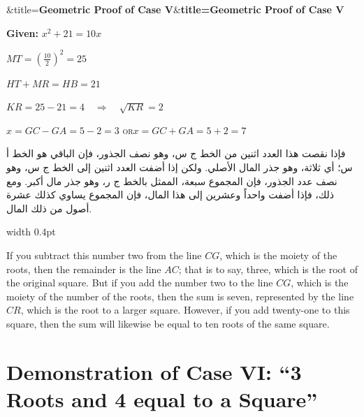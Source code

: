 \documentclass[11pt,a4paper]{book}
\newenvironment{mathbox}[1][]{%
  \smallskip\par\noindent
  \begin{lrbox}{\mathboxsave}
  \begin{minipage}{\dimexpr\linewidth-2\fboxsep-2\fboxrule\relax}%
  \setlength{\parskip}{0.3em}%
  \ifx&#1&\else\textbf{#1}\\[0.2cm]\fi
}{%
  \end{minipage}%
  \end{lrbox}
  \fcolorbox{sectioncolor}{mathbg}{\usebox{\mathboxsave}}%
  \smallskip}
\begin{document}
\vspace{0.3cm}

\begin{mathbox}[title={\textbf{Geometric Proof of Case V}}]
\begin{center}
\textbf{Given:} $x^2 + 21 = 10x$

\vspace{0.2cm}

$MT = \left(\frac{10}{2}\right)^2 = 25$

$HT + MR = HB = 21$

$KR = 25 - 21 = 4 \quad\Rightarrow\quad \sqrt{KR} = 2$

\vspace{0.2cm}

$x = GC - GA = 5 - 2 = 3$ \quad\textsc{or}\quad $x = GC + GA = 5 + 2 = 7$
\end{center}
\end{mathbox}

\noindent\begin{minipage}[t]{0.48\textwidth}
\raggedleft

\begin{Arabic}
فإذا نقصت هذا العدد اثنين من الخط ج س، وهو نصف الجذور، فإن الباقي هو الخط أ س؛ أي ثلاثة، وهو جذر المال الأصلي. ولكن إذا أضفت العدد اثنين إلى الخط ج س، وهو نصف عدد الجذور، فإن المجموع سبعة، الممثل بالخط ج ر، وهو جذر مال أكبر. ومع ذلك، فإذا أضفت واحداً وعشرين إلى هذا المال، فإن المجموع يساوي كذلك عشرة أصول من ذلك المال.
\end{Arabic}

\end{minipage}%
\hfill\vrule width 0.4pt\hfill
\begin{minipage}[t]{0.48\textwidth}
\raggedright

If you subtract this number two from the line $CG$, which is the moiety of the roots, then the remainder is the line $AC$; that is to say, three, which is the root of the original square. But if you add the number two to the line $CG$, which is the moiety of the number of the roots, then the sum is seven, represented by the line $CR$, which is the root to a larger square. However, if you add twenty-one to this square, then the sum will likewise be equal to ten roots of the same square.

\end{minipage}
\vspace{0.3cm}

\newpage

\section*{Demonstration of Case VI: ``3 Roots and 4 equal to a Square''}
\end{document}
